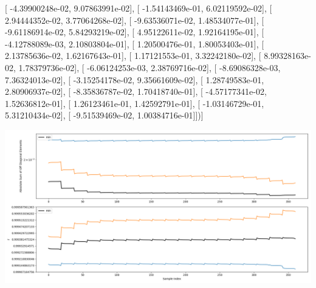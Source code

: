 \documentclass{article}
\begin{document}
       [ -4.39900248e-02,   9.07863991e-02],
       [ -1.54143469e-01,   6.02119592e-02],
       [  2.94444352e-02,   3.77064268e-02],
       [ -9.63536071e-02,   1.48534077e-01],
       [ -9.61186914e-02,   5.84293219e-02],
       [  4.95122611e-02,   1.92164195e-01],
       [ -4.12788089e-03,   2.10803804e-01],
       [  1.20500476e-01,   1.80053403e-01],
       [  2.13785636e-02,   1.62167643e-01],
       [  1.17121553e-01,   3.32242180e-02],
       [  8.99328163e-02,   1.78379736e-02],
       [ -6.06124253e-03,   2.38769716e-02],
       [ -8.69086328e-03,   7.36324013e-02],
       [ -3.15254178e-02,   9.35661609e-02],
       [  1.28749583e-01,   2.80906937e-02],
       [ -8.35836787e-02,   1.70418740e-01],
       [ -4.57177341e-02,   1.52636812e-01],
       [  1.26123461e-01,   1.42592791e-01],
       [ -1.03146729e-01,   5.31210434e-02],
       [ -9.51539469e-02,   1.00384716e-01]])]
\begin{center}
\includegraphics[scale=.9]{report_pickled_controls125/control_dpn_all.png}

\end{center}
\end{document}

